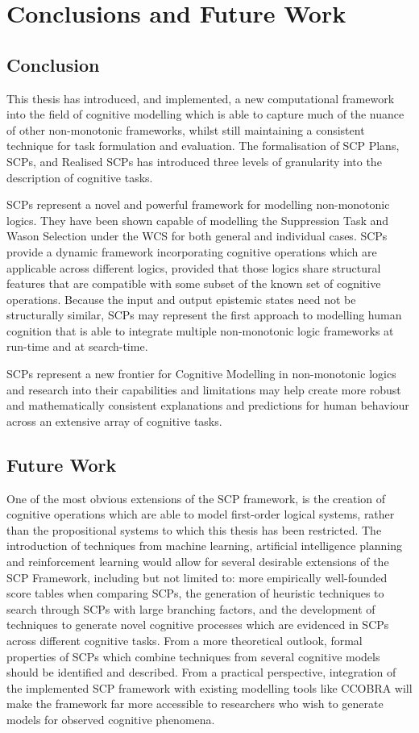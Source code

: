 \chapter{Conclusions and Future Work} \label{chp:conclusion}
\section{Conclusion}
This thesis has introduced, and implemented, a new computational framework into the field of cognitive modelling which is able to capture much of the nuance of other non-monotonic frameworks, whilst still maintaining a consistent technique for task formulation and evaluation. The formalisation of SCP Plans, SCPs, and Realised SCPs has introduced three levels of granularity into the description of cognitive tasks.

SCPs represent a novel and powerful framework for modelling non-monotonic logics. They have been shown capable of modelling the Suppression Task and Wason Selection under the WCS for both general and individual cases. SCPs provide a dynamic framework incorporating cognitive operations which are applicable across different logics, provided that those logics share structural features that are compatible with some subset of the known set of cognitive operations. Because the input and output epistemic states need not be structurally similar, SCPs may represent the first approach to modelling human cognition that is able to integrate multiple non-monotonic logic frameworks at run-time and at search-time. 

SCPs represent a new frontier for Cognitive Modelling in non-monotonic logics and research into their capabilities and limitations may help create more robust and mathematically consistent explanations and predictions for human behaviour across an extensive array of cognitive tasks.

\section{Future Work}

One of the most obvious extensions of the SCP framework, is the creation of cognitive operations which are able to model first-order logical systems, rather than the propositional systems to which this thesis has been restricted. The introduction of techniques from machine learning, artificial intelligence planning and reinforcement learning would allow for several desirable extensions of the SCP Framework, including but not limited to: more empirically well-founded score tables when comparing SCPs, the generation of heuristic techniques to search through SCPs with large branching factors, and the development of techniques to generate novel cognitive processes which are evidenced in SCPs across different cognitive tasks. From a more theoretical outlook, formal properties of SCPs which combine techniques from several cognitive models should be identified and described. From a practical perspective, integration of the implemented SCP framework with existing modelling tools like CCOBRA will make the framework far more accessible to researchers who wish to generate models for observed cognitive phenomena. 
